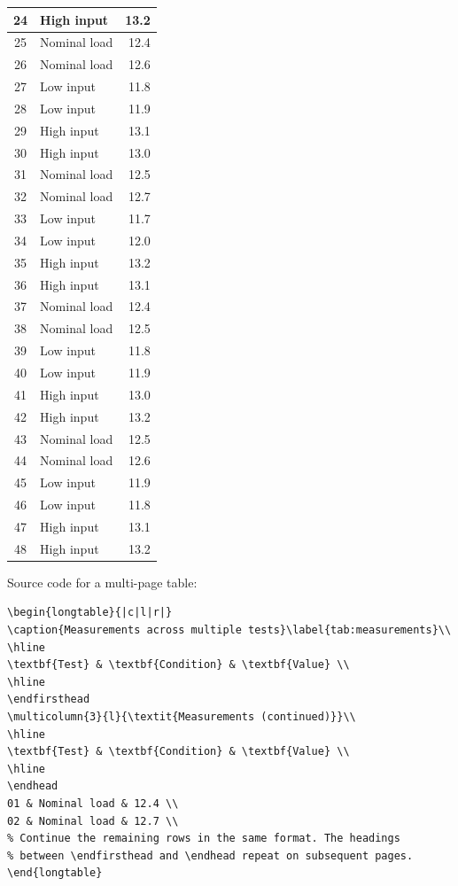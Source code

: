 {\begin{longtable}{|c|l|r|}
24 & High input & 13.2 \\\hline
25 & Nominal load & 12.4 \\\hline
26 & Nominal load & 12.6 \\\hline
27 & Low input & 11.8 \\\hline
28 & Low input & 11.9 \\\hline
29 & High input & 13.1 \\\hline
30 & High input & 13.0 \\\hline
31 & Nominal load & 12.5 \\\hline
32 & Nominal load & 12.7 \\\hline
33 & Low input & 11.7 \\\hline
34 & Low input & 12.0 \\\hline
35 & High input & 13.2 \\\hline
36 & High input & 13.1 \\\hline
37 & Nominal load & 12.4 \\\hline
38 & Nominal load & 12.5 \\\hline
39 & Low input & 11.8 \\\hline
40 & Low input & 11.9 \\\hline
41 & High input & 13.0 \\\hline
42 & High input & 13.2 \\\hline
43 & Nominal load & 12.5 \\\hline
44 & Nominal load & 12.6 \\\hline
45 & Low input & 11.9 \\\hline
46 & Low input & 11.8 \\\hline
47 & High input & 13.1 \\\hline
48 & High input & 13.2 \\\hline
\end{longtable}

Source code for a multi-page table:

\begin{verbatim}
\begin{longtable}{|c|l|r|}
\caption{Measurements across multiple tests}\label{tab:measurements}\\
\hline
\textbf{Test} & \textbf{Condition} & \textbf{Value} \\
\hline
\endfirsthead
\multicolumn{3}{l}{\textit{Measurements (continued)}}\\
\hline
\textbf{Test} & \textbf{Condition} & \textbf{Value} \\
\hline
\endhead
01 & Nominal load & 12.4 \\
02 & Nominal load & 12.7 \\
% Continue the remaining rows in the same format. The headings
% between \endfirsthead and \endhead repeat on subsequent pages.
\end{longtable}
\end{verbatim}

}
